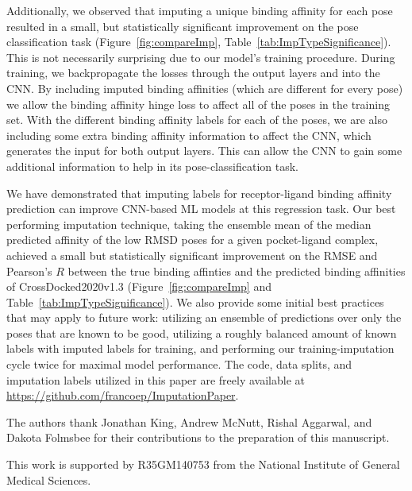 \documentclass[journal=jmcmar,manuscript=article]{achemso}
\begin{document}
Additionally, we observed that imputing a unique binding affinity for each pose resulted in a small, but statistically significant improvement on the pose classification task (Figure~\ref{fig:compareImp}, Table~\ref{tab:ImpTypeSignificance}).
This is not necessarily surprising due to our model's training procedure.
During training, we backpropagate the losses through the output layers and into the CNN.
By including imputed binding affinities (which are different for every pose) we allow the binding affinity hinge loss to affect all of the poses in the training set.
With the different binding affinity labels for each of the poses, we are also including some extra binding affinity information to affect the CNN, which generates the input for both output layers.
This can allow the CNN to gain some additional information to help in its pose-classification task.


We have demonstrated that imputing labels for receptor-ligand binding affinity prediction can improve CNN-based ML models at this regression task.
Our best performing imputation technique, taking the ensemble mean of the median predicted affinity of the low RMSD poses for a given pocket-ligand complex, achieved a small but statistically significant improvement on the RMSE and Pearson's $R$ between the true binding affinties and the predicted binding affinities of CrossDocked2020v1.3 (Figure~\ref{fig:compareImp} and Table~\ref{tab:ImpTypeSignificance}).
We also provide some initial best practices that may apply to future work: utilizing an ensemble of predictions over only the poses that are known to be good, utilizing a roughly balanced amount of known labels with imputed labels for training, and performing our training-imputation cycle twice for maximal model performance.
The code, data splits, and imputation labels utilized in this paper are freely available at \url{https://github.com/francoep/ImputationPaper}.


\begin{acknowledgement}

The authors thank Jonathan King, Andrew McNutt, Rishal Aggarwal, and Dakota Folmsbee for their contributions to the preparation of this manuscript.

This work is supported by R35GM140753 from the National Institute of General Medical Sciences.

\end{acknowledgement}
\end{document}

